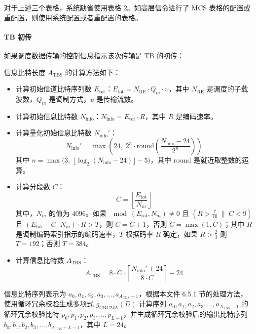 \documentclass[11pt,a4paper]{ctexart}
\begin{document}
对于上述三个表格，系统缺省使用表格 2。如高层信令进行了 MCS 表格的配置或重配置，则使用系统配置或者重配置的表格。

\paragraph{TB 初传}

如果调度数据传输的控制信息指示该次传输是 TB 的初传：

信息比特长度 $A_{\mathrm{TBS}}$ 的计算方法如下：
\begin{itemize}[nosep]
  \item 计算初始信道比特序列数 $E_{\mathrm{tot}}$：$E_{\mathrm{tot}} = N_{\mathrm{RE}} \cdot Q_m \cdot \upsilon$，其中 $N_{\mathrm{RE}}$ 是调度的子载波数，$Q_m$ 是调制方式，$\upsilon$ 是传输流数。
  \item 计算初始信息比特数 $N_{\mathrm{info}}$：$N_{\mathrm{info}} = E_{\mathrm{tot}} \cdot R$，其中 $R$ 是编码速率。
  \item 计算量化初始信息比特数 $N_{\mathrm{info}}'$：
  \begin{equation}
  N_{\mathrm{info}}' = \max\left(24,\; 2^n \cdot \mathrm{round}\!\left(\frac{N_{\mathrm{info}} - 24}{2^n}\right)\right)
  \end{equation}
  其中 $n = \max\!\bigl(3,\; \lfloor \log_2(N_{\mathrm{info}} - 24) \rfloor - 5\bigr)$，其中 $\mathrm{round}$ 是就近取整数的运算。
  \item 计算分段数 $C$：
  \begin{equation}
  C = \left\lfloor \frac{E_{\mathrm{tot}}}{N_m} \right\rfloor
  \end{equation}
  其中，$N_m$ 的值为 4096。如果 $\mod(E_{\mathrm{tot}}, N_m) \neq 0$ 且 $(R > \tfrac{7}{16} \;\|\; C < 9)$ 且 $(E_{\mathrm{tot}} - C \cdot N_m) \cdot R > T$，则 $C = C + 1$，否则 $C = \max(1, C)$；其中 $R$ 是调制编码索引指示的编码速率，$T$ 根据码率 $R$ 确定，如果 $R > \tfrac{2}{3}$ 则 $T = 192$；否则 $T = 384$。
  \item 计算信息比特数 $A_{\mathrm{TBS}}$：
  \begin{equation}
  A_{\mathrm{TBS}} = 8 \cdot C \cdot \left\lceil \frac{N_{\mathrm{info}}' + 24}{8 \cdot C} \right\rceil - 24
  \end{equation}
\end{itemize}

信息比特序列表示为 $a_0, a_1, a_2, a_3, \ldots, a_{A_{\mathrm{TBS}} - 1}$，根据本文件 6.5.1 节的处理方法，使用循环冗余校验生成多项式 $g_{\mathrm{CRC24A}}(D)$ 计算序列 $a_0, a_1, a_2, a_3, \ldots, a_{A_{\mathrm{TBS}} - 1}$ 的循环冗余校验比特 $p_0, p_1, p_2, p_3, \ldots, p_{L-1}$，并生成循环冗余校验后的输出比特序列 $b_0, b_1, b_2, b_3, \ldots, b_{A_{\mathrm{TBS}} + L - 1}$，其中 $L = 24$。
\end{document}
